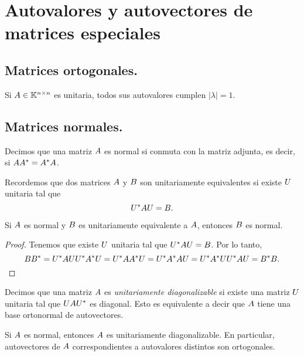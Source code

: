 \section{Autovalores y autovectores de matrices especiales}

\subsection{Matrices ortogonales.} Si $\Ab \in \K^{n \times n}$ es unitaria,
    todos sus autovalores cumplen $|\lambda| = 1$.

\subsection{Matrices normales.}
Decimos que una matriz $\Ab$ es normal si conmuta con la matriz adjunta, es decir, si $\Ab \Ab^* = \Ab^* \Ab$.

Recordemos que dos matrices $\Ab$ y $\Bb$ son unitariamente equivalentes si existe $\Ub$ unitaria tal que
$$
\Ub^* \Ab \Ub = \Bb.
$$

\begin{prop}
\label{prop:normal}
Si $\Ab$ es normal y $\Bb$ es unitariamente equivalente a $\Ab$, entonces $\Bb$ es normal.
\end{prop}
\begin{proof}
Tenemos que existe $\Ub$ unitaria tal que $\Ub^* \Ab \Ub = \Bb$. Por lo tanto,
$$
\Bb \Bb^* = \Ub^* \Ab \Ub \Ub^* \Ab^* \Ub = \Ub^* \Ab \Ab^* \Ub = \Ub^* \Ab^* \Ab \Ub = \Ub^* \Ab^* \Ub \Ub^* \Ab \Ub = \Bb^* \Bb.
$$
\end{proof}

Decimos que una matriz $\Ab$ es \emph{unitariamente diagonalizable} si existe una matriz $\Ub$ unitaria tal que $\Ub \Ab \Ub^*$ es diagonal. Esto es equivalente a decir que $\Ab$ tiene una base ortonormal de autovectores.

\begin{prop}
Si $\Ab$ es normal, entonces $\Ab$ es unitariamente diagonalizable. En particular, autovectores de $\Ab$ correspondientes a autovalores distintos son ortogonales.
\end{prop}

